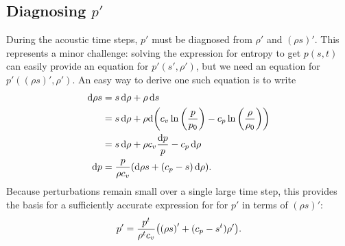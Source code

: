 \documentclass[11pt]{article}
\begin{document}
\subsection{Diagnosing $p'$}

During the acoustic time steps, $p'$ must be diagnosed from $\rho'$ and $(\rho s)'$. This represents a minor challenge: solving the expression for entropy to get $p(s,t)$ can easily provide an equation for $p'(s', \rho')$, but we need an equation for $p'((\rho s)', \rho')$. An easy way to derive one such equation is to write
\begin{align*}
\dd{\rho s} &= s \dd{\rho} + \rho \dd{s} \\
&= s \dd{\rho} + \rho \dd \qty(c_v \ln \qty(\frac{p}{p_0}) - c_p \ln \qty(\frac{\rho}{\rho_0})) \\
&= s \dd{\rho} + \rho c_v \frac{\dd{p}}{p} - c_p \dd{\rho} \\
\dd{p} &= \frac{p}{\rho c_v} \qty(\dd{\rho s} + \qty(c_p - s) \dd{\rho}).
\end{align*}
Because perturbations remain small over a single large time step, this provides the basis for a sufficiently accurate expression for for $p'$ in terms of $(\rho s)'$:
\begin{equation}
p' = \frac{p^t}{\rho^t c_v} \qty(\qty(\rho s)' + (c_p - s^t) \rho').
\end{equation}
\end{document}
